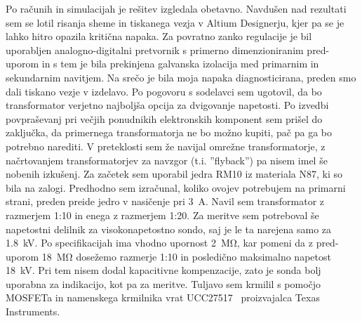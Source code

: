 \documentclass[a4paper,twoside,openright,12pt,Slovene]{book}
\begin{document}
	Po računih in simulacijah je rešitev izgledala obetavno. Navdušen nad rezultati sem se lotil risanja sheme in tiskanega vezja v Altium Designerju, kjer pa se je lahko hitro opazila kritična napaka. Za povratno zanko regulacije je bil uporabljen analogno-digitalni pretvornik s primerno dimenzioniranim pred-uporom in s tem je bila prekinjena galvanska izolacija med primarnim in sekundarnim navitjem. Na srečo je bila moja napaka diagnosticirana, preden smo dali tiskano vezje v izdelavo. Po pogovoru s sodelavci sem ugotovil, da bo transformator verjetno najboljša opcija za dvigovanje napetosti. Po izvedbi povpraševanj pri večjih ponudnikih elektronskih komponent sem prišel do zaključka, da primernega transformatorja ne bo možno kupiti, pač pa ga bo potrebno narediti. V preteklosti sem že navijal omrežne transformatorje, z načrtovanjem transformatorjev za navzgor (t.i. ''flyback'') pa nisem imel še nobenih izkušenj. Za začetek sem uporabil jedra RM10 iz materiala N87, ki so bila na zalogi. Predhodno sem izračunal, koliko ovojev potrebujem na primarni strani, preden preide jedro v nasičenje pri \SI{3}{\ampere}. Navil sem transformator z razmerjem 1:10 in enega z razmerjem 1:20.
Za meritve sem potreboval še napetostni delilnik za visokonapetostno sondo, saj je le ta narejena samo za \SI{1.8}{\kilo\volt}. Po specifikacijah ima vhodno upornost \SI{2}{\mega\ohm}, kar pomeni da z pred-uporom \SI{18}{\mega\ohm} dosežemo razmerje 1:10 in posledično maksimalno napetost \SI{18}{\kilo\volt}. Pri tem nisem dodal kapacitivne kompenzacije, zato je sonda bolj uporabna za indikacijo, kot pa za meritve. Tuljavo sem krmilil s pomočjo MOSFETa in namenskega krmilnika vrat UCC27517~\cite{TI:UCC27517} proizvajalca Texas Instruments. 
\end{document}
